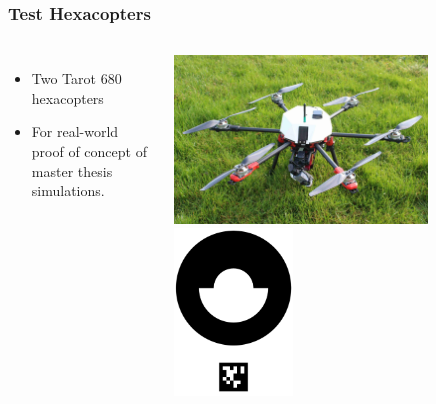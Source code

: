 \documentclass[aspectratio=169]{rubeamer}
\newif\ifpause
\newcommand{\mypause}{\ifpause \pause \fi}
\begin{document}
\begin{frame}
  \frametitle{Test Hexacopters}
  \begin{columns}
    \begin{itemize}
      \item Two Tarot 680 hexacopters
      \item For real-world proof of concept of master thesis simulations.
    \end{itemize}
    \centering
    \onslide
    \includegraphics[width=0.75\textwidth]{coral_drone}\\
    \mypause
    \includegraphics[width=0.35\textwidth, angle=-90]{original_landing_pad}
  \end{columns}
\end{frame}
\end{document}
